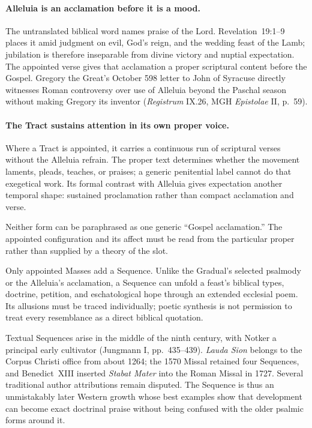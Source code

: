 
\paragraph{Alleluia is an acclamation before it is a mood.}
The untranslated biblical word names praise of the Lord. Revelation~19:1--9 places it amid judgment on evil, God's reign, and the wedding feast of the Lamb; jubilation is therefore inseparable from divine victory and nuptial expectation. The appointed verse gives that acclamation a proper scriptural content before the Gospel. Gregory the Great's October 598 letter to John of Syracuse directly witnesses Roman controversy over use of Alleluia beyond the Paschal season without making Gregory its inventor (\emph{Registrum} IX.26, MGH \emph{Epistolae} II, p.~59).

\paragraph{The Tract sustains attention in its own proper voice.}
Where a Tract is appointed, it carries a continuous run of scriptural verses without the Alleluia refrain. The proper text determines whether the movement laments, pleads, teaches, or praises; a generic penitential label cannot do that exegetical work. Its formal contrast with Alleluia gives expectation another temporal shape: sustained proclamation rather than compact acclamation and verse.

Neither form can be paraphrased as one generic ``Gospel acclamation.'' The appointed configuration and its affect must be read from the particular proper rather than supplied by a theory of the slot.


Only appointed Masses add a Sequence. Unlike the Gradual's selected psalmody or the Alleluia's acclamation, a Sequence can unfold a feast's biblical types, doctrine, petition, and eschatological hope through an extended ecclesial poem. Its allusions must be traced individually; poetic synthesis is not permission to treat every resemblance as a direct biblical quotation.

Textual Sequences arise in the middle of the ninth century, with Notker a principal early cultivator (Jungmann I, pp.~435--439). \emph{Lauda Sion} belongs to the Corpus Christi office from about 1264; the 1570 Missal retained four Sequences, and Benedict~XIII inserted \emph{Stabat Mater} into the Roman Missal in 1727. Several traditional author attributions remain disputed. The Sequence is thus an unmistakably later Western growth whose best examples show that development can become exact doctrinal praise without being confused with the older psalmic forms around it.

